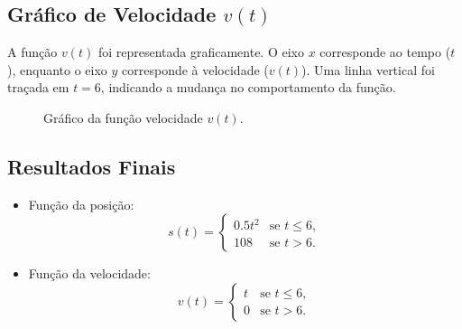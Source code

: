 \subsection*{Gráfico de Velocidade \(v(t)\)}
A função \(v(t)\) foi representada graficamente. O eixo \(x\) corresponde ao tempo (\(t\)), enquanto o eixo \(y\) corresponde à velocidade (\(v(t)\)). Uma linha vertical foi traçada em \(t = 6\), indicando a mudança no comportamento da função.

\begin{figure}[H]
    \centering
    \caption{Gráfico da função velocidade \(v(t)\).}\label{fig:figure}
\end{figure}

\subsection*{Resultados Finais}
\begin{itemize}
    \item Função da posição:
    \[
    s(t) = 
    \begin{cases} 
    0.5t^2 & \text{se } t \leq 6, \\
    108 & \text{se } t > 6.
    \end{cases}
    \]
    \item Função da velocidade:
    \[
    v(t) = 
    \begin{cases} 
    t & \text{se } t \leq 6, \\
    0 & \text{se } t > 6.
    \end{cases}
    \]
\end{itemize}
